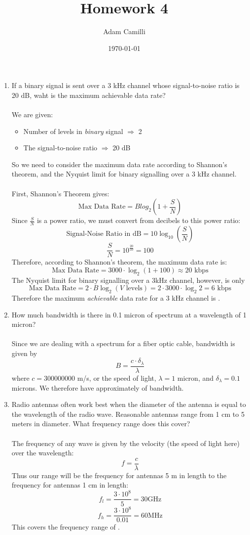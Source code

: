\documentclass[12pt]{article}
\begin{document}
\title{Homework 4}
\author{Adam Camilli}
\date{\today}
\maketitle

\begin{enumerate}
\item If a binary signal is sent over a 3 kHz channel whose signal-to-noise ratio is 20 dB, waht is the maximum achievable data rate?
  \\ \\
  We are given:
  \begin{itemize}
  \item Number of levels in \textit{binary} signal $\Rightarrow$ 2
  \item The signal-to-noise ratio $\Rightarrow$ 20 dB
  \end{itemize}
  So we need to consider the maximum data rate according to Shannon's theorem, and the Nyquist limit for binary signalling over a 3 kHz channel.
\\ \\
First, Shannon's Theorem gives:
\[ \textrm{Max Data Rate} = Blog_2(1 + \frac{S}{N}) \]
Since $\frac{S}{N}$ is a power ratio, we must convert from decibels to this power ratio:
\[ \textrm{Signal-Noise Ratio in dB} = 10\log_{10}(\frac{S}{N}) \]
\[ \frac{S}{N} = 10^{\frac{20}{10}} = 100 \]
Therefore, according to Shannon's theorem, the maximum data rate is: 
\[ \textrm{Max Data Rate} = 3000 \cdot \log_2(1 + 100) \approx 20 \textrm{ kbps} \]
The Nyquist limit for binary signalling over a 3kHz channel, however, is only 
\[ \textrm{Max Data Rate} = 2\cdot B\log_{2}(V\textrm{ levels}) = 2 \cdot 3000 \cdot \log_{2}2 = 6 \textrm{ kbps} \]
Therefore the maximum \textit{achievable} data rate for a 3 kHz channel is .

\newpage

\item How much bandwidth is there in 0.1 micron of spectrum at a wavelength of 1 micron?
\\ \\
Since we are dealing with a spectrum for a fiber optic cable, bandwidth is given by
\[ B = \frac{c \cdot \delta_{\lambda}}{\lambda} \]
where $c = 300000000$ m/s, or the speed of light, $\lambda = 1$ micron, and $\delta_{\lambda} = 0.1$ microns. We therefore have approximately  of bandwidth. 

\item Radio antennas often work best when the diameter of the antenna is equal to the wavelength of the radio wave. Reasonable antennas range from 1 cm to 5 meters in diameter. What frequency range does this cover?
\\ \\
The frequency of any wave is given by the velocity (the speed of light here) over the wavelength: 
\[ f = \frac{c}{\lambda} \]
Thus our range will be the frequency for antennas 5 m in length to the frequency for antennas 1 cm in length:
\[ f_l = \frac{3 \cdot 10^8}{5} = 30 \textrm{GHz} \]
\[ f_h = \frac{3 \cdot 10^8}{0.01} = 60 \textrm{MHz} \]
This covers the frequency range of .


\end{enumerate}
\end{document}
